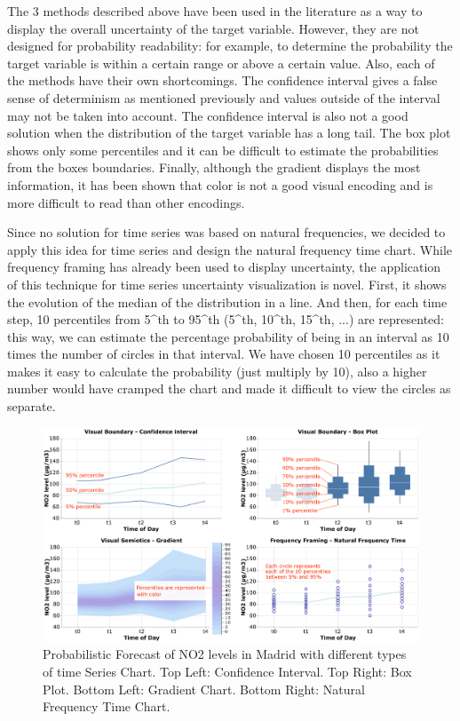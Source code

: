 \documentclass[a4paper,3p,sort&compress]{elsarticle}
\begin{document}
The 3 methods described above have been used in the literature as a way to display the overall uncertainty 
of the target variable. However, they are not designed for probability readability: for example, to determine 
the probability the target variable is within a certain range or above a certain value. Also,
each of the methods have their own shortcomings. The confidence interval gives a false sense of determinism as mentioned previously
and values outside of the interval may not be taken into account. The confidence interval is also not a good solution 
when the distribution of the target variable has a long tail. The box plot shows only some percentiles and it can be difficult to 
estimate the probabilities from the boxes boundaries. Finally, although the gradient displays the most information, it has been 
shown \cite{cleveland_graphical_1984} that color is not 
a good visual encoding and is more difficult to read than other encodings.

Since no solution for time series was based on natural frequencies, we decided to apply this idea for time series 
and design the natural frequency time chart.
While frequency framing has already been used to display uncertainty, the application of this technique for time series 
uncertainty visualization is novel. First, 
it shows the evolution of the median of the distribution in a line. And then, for each time 
step, 10 percentiles from 5^th to 95^th (5^th, 10^th, 15^th, ...) are represented: this way, we can estimate the percentage 
probability of being in an interval as 10 times the number of circles in that interval. 
We have chosen 10 percentiles as it makes it easy to calculate the probability (just multiply by 10), also a higher number
would have cramped the chart and made it difficult to view the circles as separate. 

\begin{figure}
  \centering
  \includegraphics[width=.9\textwidth]{charts_vector} 
  \caption{\label{figure:charts} Probabilistic Forecast of NO2 levels in Madrid with different types of time Series Chart. 
  Top Left: Confidence Interval. Top Right: Box Plot. 
  Bottom Left: Gradient Chart. Bottom Right: Natural Frequency Time Chart. }
\end{figure} 
\end{document}
